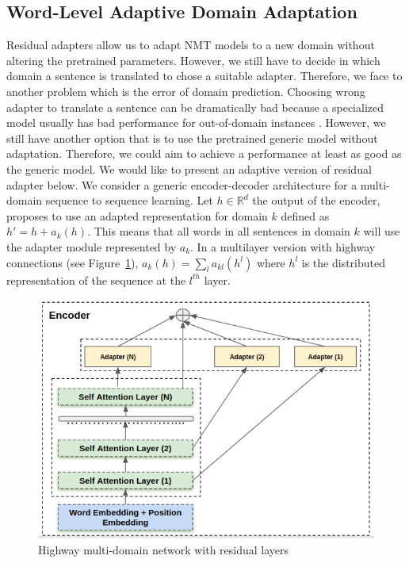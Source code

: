 \documentclass[11pt,a4paper]{article}
\newcommand{\R}{\ensuremath{\mathbb{R}}}
\newcommand{\fyTodo}[1]{\Todo[FY:]{\textcolor{orange}{#1}}}
\newcommand{\mpTodo}[1]{\Todo[MP:]{\textcolor{green}{#1}}}
\begin{document}
\subsection{Word-Level Adaptive Domain Adaptation \label{ssec:wada}}
\mpTodo{Formalizing problem, network design, training algorithm}
Residual adapters allow us to adapt NMT models to a new domain without altering the pretrained parameters. However, we still have to decide in which domain a sentence is translated to chose a suitable adapter.\fyTodo{Lack of context - domain errors} Therefore, we face to another problem which is the error of domain prediction. Choosing wrong adapter to translate a sentence can be dramatically bad because a specialized model usually has bad performance for out-of-domain instances \cite{McCloskey89catastrophic}. However, we still have another option that is to use the pretrained generic model without adaptation. Therefore, we could aim to achieve a performance at least as good as the generic model. We would like to present an adaptive version of residual adapter below.
\fyTodo{Consistency of notations wrt section 2.1}
We consider a generic encoder-decoder architecture for a multi-domain sequence to sequence learning. Let $h \in \R^d$ the output of the encoder, \cite{bapna19simple} proposes to use an adapted representation for domain $k$ defined as $h' = h + a_k(h)$. This means that all words in all sentences in domain $k$ will use the adapter module represented by $a_k$. In a multilayer version with highway connections (see Figure~\ref{fig:hrl-architecture}), $a_k(h) = \sum_{l} a_{kl}(h^l)$ where $h^l$ is the distributed representation of the sequence at the $l^{th}$ layer.
\begin{figure}[htbp]
  \centering
  \includegraphics[scale=0.3]{fig/highway_residual}
  \caption{Highway multi-domain network with residual layers}
\label{fig:hrl-architecture}
\end{figure}
\end{document}
